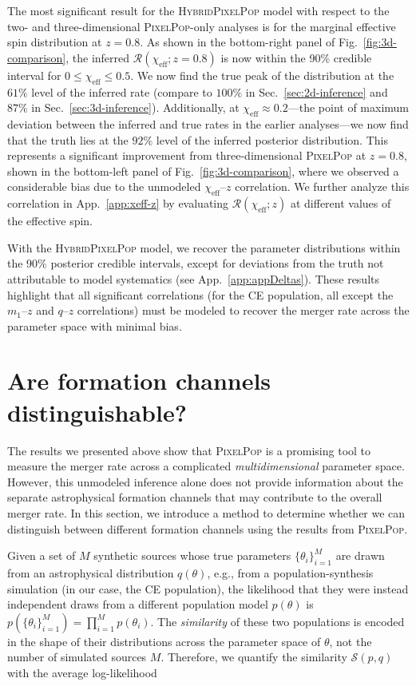\documentclass[twocolumn, twocolappendix]{aastex631}
\newcommand{\ztwo}{0.8}
\newcommand{\chieff}{\ensuremath{\chi_\mathrm{eff}}}
\newcommand{\PixelPop}{\textsc{PixelPop}\xspace}
\newcommand{\Hybrid}{\textsc{Hybrid}\xspace}
\begin{document}
The most significant result for the \Hybrid \PixelPop model with respect to the two- and three-dimensional \PixelPop-only analyses is for the marginal effective spin distribution at $z=\ztwo$. As shown in the bottom-right panel of Fig.~\ref{fig:3d-comparison}, the inferred $\mathcal{R}(\chieff;z=\ztwo)$ is now within the 90\% credible interval for $0 \leq \chieff \leq 0.5$. We now find the true peak of the distribution at the $61\%$ level of the inferred rate (compare to $100\%$ in Sec.~\ref{sec:2d-inference} and $87\%$ in Sec.~\ref{sec:3d-inference}). Additionally, at $\chieff\approx0.2$---the point of maximum deviation between the inferred and true rates in the earlier analyses---we now find that the truth lies at the $92\%$ level of the inferred posterior distribution. This represents a significant improvement from three-dimensional \PixelPop at $z=\ztwo$, shown in the bottom-left panel of Fig.~\ref{fig:3d-comparison}, where we observed a considerable bias due to the unmodeled $\chieff$--$z$ correlation. We further analyze this correlation in App.~\ref{app:xeff-z} by evaluating $\mathcal{R}(\chieff;z)$ at different values of the effective spin. 

With the \Hybrid \PixelPop model, we recover the parameter distributions within the 90\% posterior credible intervals, except for deviations from the truth not attributable to model systematics (see App.~\ref{app:appDeltas}). These results highlight that all significant correlations (for the \ac{CE} population, all except the $m_1$--$z$ and $q$--$z$ correlations) must be modeled to recover the merger rate across the parameter space with minimal bias. 

\section{Are formation channels distinguishable?}
\label{sec:cross-entropy}

The results we presented above show that \PixelPop is a promising tool to measure the merger rate across a complicated \textit{multidimensional} parameter space. However, this unmodeled inference alone does not provide information about the separate astrophysical formation channels that may contribute to the overall merger rate. In this section, we introduce a method
to determine whether we can distinguish between different formation channels using the results from \PixelPop. 

Given a set of $M$ synthetic sources whose true parameters $\{\theta_i\}_{i=1}^M$  are drawn from an astrophysical distribution $q(\theta)$, e.g., from a population-synthesis simulation (in our case, the \ac{CE} population), the likelihood that they were instead independent draws from a different population model $p(\theta)$ is $p (\{\theta_i\}_{i=1}^M) = \prod_{i=1}^M p(\theta_i)$. The \textit{similarity} of these two populations is encoded in the shape of their distributions across the parameter space of $\theta$, not the number of simulated sources $M$. Therefore, we quantify the similarity $\mathcal{S}(p,q)$ with the average log-likelihood
\end{document}
